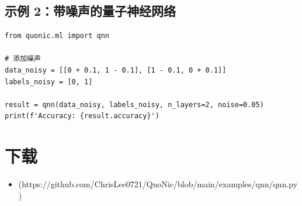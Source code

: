 \documentclass[12pt,a4paper]{article}
\begin{document}
\subsection{示例 2：带噪声的量子神经网络}

\begin{verbatim}
from quonic.ml import qnn

# 添加噪声
data_noisy = [[0 + 0.1, 1 - 0.1], [1 - 0.1, 0 + 0.1]]
labels_noisy = [0, 1]

result = qnn(data_noisy, labels_noisy, n_layers=2, noise=0.05)
print(f'Accuracy: {result.accuracy}')
\end{verbatim}

\section{下载}

\begin{itemize}
  \item [qnn.py](https://github.com/ChrisLee0721/QuoNic/blob/main/examples/qnn/qnn.py)
\end{itemize}
\end{document}
